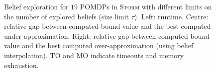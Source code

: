\begin{figure}[t]
  \centering
  \StormPOMDPAggregateFigure
  \caption{Belief exploration for $19$ POMDPs in \textsc{Storm} with different limits on the number of explored beliefs (size limit $\tau$).
    Left: runtime.
    Centre: relative gap between computed bound value and the best computed under-approximation.
    Right: relative gap between computed bound value and the best computed over-approximation (using belief interpolation).
    TO and MO indicate timeouts and memory exhaustion.}
  \label{fig:pomdp-benchmarks}
\end{figure}

